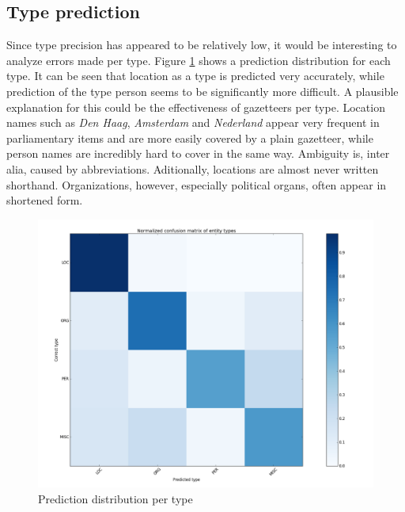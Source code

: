 \subsection{Type prediction}\label{subsec:type_pred}
Since type precision has appeared to be relatively low, it would be interesting to analyze errors made per type. Figure \ref{fig:confusion} shows a prediction distribution for each type. 
It can be seen that location as a type is predicted very accurately, while prediction of the type person seems to be significantly more difficult. A plausible explanation for this could be the effectiveness of gazetteers per type. Location names such as \textit{Den Haag}, \textit{Amsterdam} and \textit{Nederland} appear very frequent in parliamentary items and are more easily covered by a plain gazetteer, while person names are incredibly hard to cover in the same way. Ambiguity is, inter alia, caused by abbreviations. Aditionally, locations are almost never written shorthand. Organizations, however, especially political organs, often appear in shortened form. 

\begin{figure}[h]
    \centering
    \includegraphics[scale=0.4]{fig/confusion_matrix_reclassified}
    \caption{Prediction distribution per type}
    \label{fig:confusion}
\end{figure}
